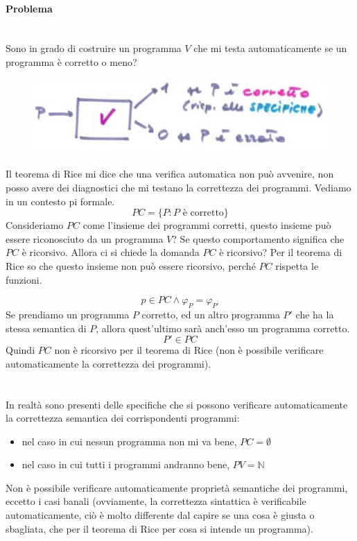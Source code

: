 \documentclass{article}
\begin{document}
\paragraph{Problema}\mbox{}\\
Sono in grado di costruire un programma $V$ che mi testa automaticamente se un
programma è corretto o meno?
\begin{figure}[H]
    \centering
    \includegraphics[scale=0.6]{images/programma_V.png}
\end{figure}
Il teorema di Rice mi dice che una verifica automatica non può avvenire, non posso
avere dei diagnostici che mi testano la correttezza dei programmi. Vediamo in un contesto
pi formale.
$$PC=\{P:P\text{ è corretto}\}$$
Consideriamo $PC$ come l'insieme dei programmi corretti, questo insieme può essere riconosciuto
da un programma $V$? Se questo comportamento significa che $PC$ è ricorsivo. Allora ci si chiede
la domanda $PC$ è ricorsivo? Per il teorema di Rice so che questo insieme non può essere
ricorsivo, perché $PC$ rispetta le funzioni.

$$p\in PC \land \varphi_P = \varphi_{P'}$$
Se prendiamo un programma $P$ corretto, ed un altro programma $P'$ che ha la stessa semantica
di $P$, allora quest'ultimo sarà anch'esso un programma corretto.
$$P'\in PC$$
Quindi $PC$ non è ricorsivo per il teorema di Rice (non è possibile verificare automaticamente
la correttezza dei programmi).

\paragraph{}\mbox{}\\
In realtà sono presenti delle specifiche che si possono verificare automaticamente
la correttezza semantica dei corrispondenti programmi:
\begin{itemize}
    \item nel caso in cui nessun programma non mi va bene, $PC=\emptyset$
    \item nel caso in cui tutti i programmi andranno bene, $PV=\mathbb{N}$
\end{itemize}
Non è possibile verificare automaticamente proprietà semantiche dei programmi, eccetto
i casi banali (ovviamente, la correttezza sintattica è verificabile automaticamente,
ciò è molto differente dal capire se una cosa è giusta o sbagliata, che per il
teorema di Rice per cosa si intende un programma).
\pagebreak
\end{document}
